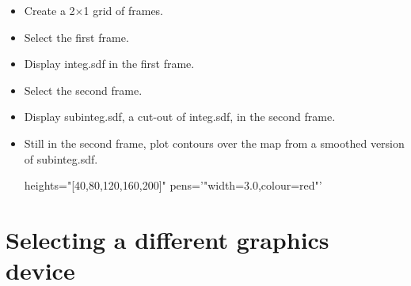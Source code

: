 \documentclass[11pt,oneside,chapters]{starlink}
\begin{document}
\begin{itemize}
\item Create a 2$\times$1 grid of frames.
\begin{terminalv}
\end{terminalv}
\item Select the first frame.
\begin{terminalv}
\end{terminalv}
\item Display integ.sdf in the first frame.
\begin{terminalv}
\end{terminalv}


\item Select the second frame.
\begin{terminalv}
\end{terminalv}
\item Display subinteg.sdf, a cut-out of integ.sdf, in the second frame.
\begin{terminalv}
\end{terminalv}

\item Still in the second frame, plot contours over the map from a smoothed version of subinteg.sdf.
\begin{terminalv}
  heights="[40,80,120,160,200]" pens='"width=3.0,colour=red"'
\end{terminalv}
\end{itemize}


\section{Selecting a different graphics device}
\end{document}
